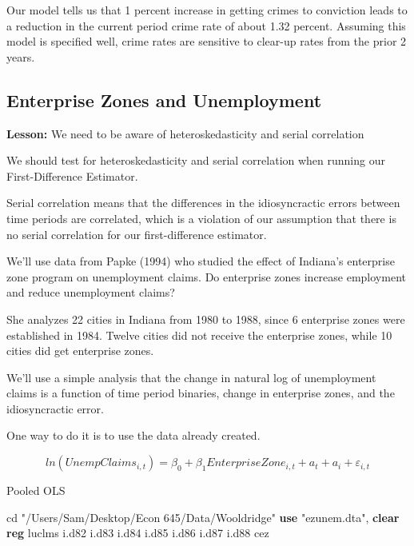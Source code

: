 \documentclass[
]{book}
\newenvironment{Shaded}{\begin{snugshade}}{\end{snugshade}}
\newcommand{\KeywordTok}[1]{\textcolor[rgb]{0.13,0.29,0.53}{\textbf{#1}}}
\newcommand{\NormalTok}[1]{#1}
\newcommand{\StringTok}[1]{\textcolor[rgb]{0.31,0.60,0.02}{#1}}
\begin{document}
Our model tells us that 1 percent increase in getting crimes to conviction leads to a reduction in the current period crime rate of about 1.32 percent. Assuming this model is specified well, crime rates are sensitive to clear-up rates from the prior 2 years.

\subsection{Enterprise Zones and Unemployment}\label{enterprise-zones-and-unemployment}

\textbf{Lesson:} We need to be aware of heteroskedasticity and serial correlation

We should test for heteroskedasticity and serial correlation when running our First-Difference Estimator.

Serial correlation means that the differences in the idiosyncractic errors between time periods are correlated, which is a violation of our assumption that there is no serial correlation for our first-difference estimator.

We'll use data from Papke (1994) who studied the effect of Indiana's enterprise zone program on unemployment claims. Do enterprise zones increase employment and reduce unemployment claims?

She analyzes 22 cities in Indiana from 1980 to 1988, since 6 enterprise zones were established in 1984. Twelve cities did not receive the enterprise zones, while 10 cities did get enterprise zones.

We'll use a simple analysis that the change in natural log of unemployment
claims is a function of time period binaries, change in enterprise zones, and
the idiosyncractic error.

One way to do it is to use the data already created.

\[ ln(UnempClaims_{i,t}) = \beta_0 + \beta_1 EnterpriseZone_{i,t} + a_t + a_i + \varepsilon_{i,t} \]

Pooled OLS

\begin{Shaded}
\begin{Highlighting}[]
\NormalTok{cd }\StringTok{"/Users/Sam/Desktop/Econ 645/Data/Wooldridge"}
\KeywordTok{use} \StringTok{"ezunem.dta"}\NormalTok{, }\KeywordTok{clear}
\KeywordTok{reg}\NormalTok{ luclms i.d82 i.d83 i.d84 i.d85 i.d86 i.d87 i.d88 cez}
\end{Highlighting}
\end{Shaded}
\end{document}
